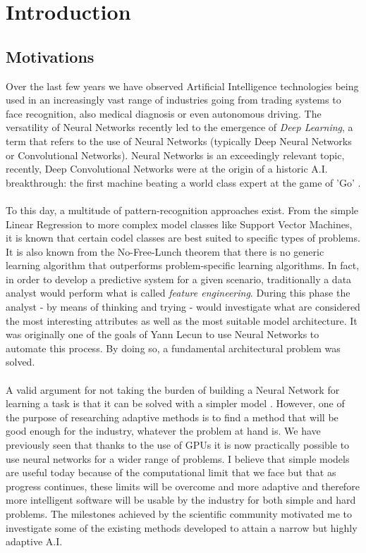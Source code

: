 \documentclass[a4paper,12pt, oneside]{memoir}
\begin{document}
\chapter{Introduction}

\section{Motivations}

Over the last few years we have observed Artificial Intelligence technologies being used in an increasingly vast range of industries going from trading systems to face recognition, also medical diagnosis or even autonomous driving. The versatility of Neural Networks recently led to the emergence of \textit{Deep Learning}, a term that refers to the use of Neural Networks (typically Deep Neural Networks or Convolutional Networks\cite{lecun-convolutional-2010}). Neural Networks is an exceedingly relevant topic, recently, Deep Convolutional Networks were at the origin of a historic A.I. breakthrough: the first machine beating a world class expert at the game of 'Go' \cite{hassabis-2016}.
\\ \\
To this day, a multitude of pattern-recognition approaches exist. From the simple Linear Regression to more complex model classes like Support Vector Machines, it is known that certain codel classes are best suited to specific types of problems. It is also known from the No-Free-Lunch theorem that there is no generic learning algorithm that outperforms problem-specific learning algorithms. In fact, in order to develop a predictive system for a given scenario, traditionally a data analyst would perform what is called \textit{feature engineering}. During this phase the analyst - by means of thinking and trying - would investigate what are considered the most interesting attributes as well as the most suitable model architecture. It was originally one of the goals of Yann Lecun to use Neural Networks to automate this process\cite{lecun-data-driven-2014}. By doing so, a fundamental architectural problem was solved. 
\\ \\
A valid argument for not taking the burden of building a Neural Network for learning a task is that it can be solved with a simpler model \cite{chilimbi-2014} \cite{huang-2013}. However, one of the purpose of researching adaptive methods is to find a method that will be good enough for the industry, whatever the problem at hand is. We have previously seen that thanks to the use of GPUs it is now practically possible to use neural networks for a wider range of problems. I believe that simple models are useful today because of the computational limit that we face but that as progress continues, these limits will be overcome and more adaptive and therefore more intelligent software will be usable by the industry for both simple and hard problems. The milestones achieved by the scientific community motivated me to investigate some of the existing methods developed to attain a narrow but highly adaptive A.I. 
\end{document}
